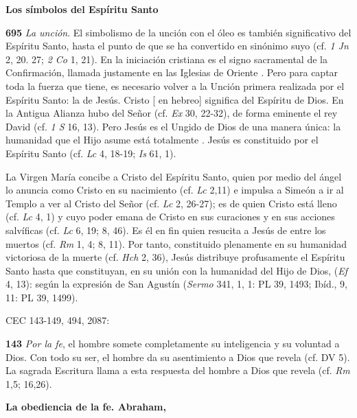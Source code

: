 \textbf{Los símbolos del Espíritu Santo}

\textbf{695} \emph{La unción}. El simbolismo de la unción con el óleo es también significativo del Espíritu Santo, hasta el punto de que se ha convertido en sinónimo suyo (cf. \emph{1 Jn} 2, 20. 27; \emph{2 Co} 1, 21). En la iniciación cristiana es el signo sacramental de la Confirmación, llamada justamente en las Iglesias de Oriente . Pero para captar toda la fuerza que tiene, es necesario volver a la Unción primera realizada por el Espíritu Santo: la de Jesús. Cristo {[} en hebreo{]} significa  del Espíritu de Dios. En la Antigua Alianza hubo  del Señor (cf. \emph{Ex} 30, 22-32), de forma eminente el rey David (cf. \emph{1 S} 16, 13). Pero Jesús es el Ungido de Dios de una manera única: la humanidad que el Hijo asume está totalmente . Jesús es constituido  por el Espíritu Santo (cf. \emph{Lc} 4, 18-19; \emph{Is} 61, 1).

La Virgen María concibe a Cristo del Espíritu Santo, quien por medio del ángel lo anuncia como Cristo en su nacimiento (cf. \emph{Lc} 2,11) e impulsa a Simeón a ir al Templo a ver al Cristo del Señor (cf. \emph{Lc} 2, 26-27); es de quien Cristo está lleno (cf. \emph{Lc} 4, 1) y cuyo poder emana de Cristo en sus curaciones y en sus acciones salvíficas (cf. \emph{Lc} 6, 19; 8, 46). Es él en fin quien resucita a Jesús de entre los muertos (cf. \emph{Rm} 1, 4; 8, 11). Por tanto, constituido plenamente  en su humanidad victoriosa de la muerte (cf. \emph{Hch} 2, 36), Jesús distribuye profusamente el Espíritu Santo hasta que  constituyan, en su unión con la humanidad del Hijo de Dios,  (\emph{Ef} 4, 13):  según la expresión de San Agustín (\emph{Sermo} 341, 1, 1: PL 39, 1493; Ibíd., 9, 11: PL 39, 1499).


CEC 143-149, 494, 2087:

\textbf{143} \emph{Por la fe}, el hombre somete completamente su inteligencia y su voluntad a Dios. Con todo su ser, el hombre da su asentimiento a Dios que revela (cf. DV 5). La sagrada Escritura llama  a esta respuesta del hombre a Dios que revela (cf. \emph{Rm} 1,5; 16,26).

\textbf{La obediencia de la fe. Abraham, }

